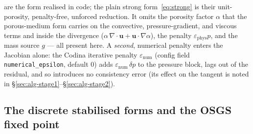 \documentclass{article}
\newcommand{\code}[1]{\texttt{\small #1}}
\begin{document}
are the form realised in code; the plain strong form~\eqref{eq:strong} is
their unit-porosity, penalty-free, unforced reduction. It omits the
porosity factor $\alpha$ that the porous-medium form carries on the
convective, pressure-gradient, and viscous terms and inside the divergence
($\alpha\,\nabla\!\cdot\!\boldsymbol{u} + \boldsymbol{u}\!\cdot\!\nabla\alpha$),
the penalty $\varepsilon_{\mathrm{phys}} p$, and the mass source $g$ --- all
present here. A \emph{second},
numerical penalty enters the Jacobian alone: the Codina iterative penalty
$\varepsilon_{\mathrm{num}}$ (config field \code{numerical\_epsilon},
default $0$) adds $\varepsilon_{\mathrm{num}}\,\delta p$ to the pressure
block, lags out of the residual, and so introduces no consistency error
(its effect on the tangent is noted in §\ref{sec:alg-stage1}--§\ref{sec:alg-stage2}).

\subsection{The discrete stabilised forms and the OSGS fixed point}
\label{sec:alg-osgs-fixedpoint}
\end{document}
